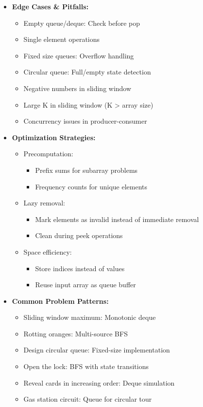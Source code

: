\documentclass[a4paper,10pt]{book}
\begin{document}
\begin{itemize}
    \item \textbf{Edge Cases \& Pitfalls:}
    \begin{itemize}
        \item Empty queue/deque: Check before pop
        \item Single element operations
        \item Fixed size queues: Overflow handling
        \item Circular queue: Full/empty state detection
        \item Negative numbers in sliding window
        \item Large K in sliding window (K > array size)
        \item Concurrency issues in producer-consumer
    \end{itemize}
    
    \item \textbf{Optimization Strategies:}
    \begin{itemize}
        \item Precomputation:
        \begin{itemize}
            \item Prefix sums for subarray problems
            \item Frequency counts for unique elements
        \end{itemize}
        \item Lazy removal:
        \begin{itemize}
            \item Mark elements as invalid instead of immediate removal
            \item Clean during peek operations
        \end{itemize}
        \item Space efficiency:
        \begin{itemize}
            \item Store indices instead of values
            \item Reuse input array as queue buffer
        \end{itemize}
    \end{itemize}
    
    \item \textbf{Common Problem Patterns:}
    \begin{itemize}
        \item Sliding window maximum: Monotonic deque
        \item Rotting oranges: Multi-source BFS
        \item Design circular queue: Fixed-size implementation
        \item Open the lock: BFS with state transitions
        \item Reveal cards in increasing order: Deque simulation
        \item Gas station circuit: Queue for circular tour
    \end{itemize}
    

\end{itemize}
\end{document}
